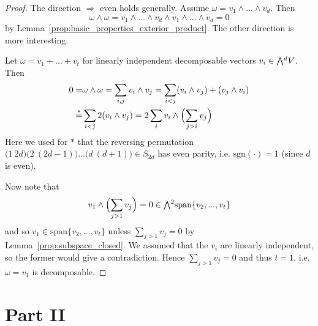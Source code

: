 \documentclass{scrartcl}
\newcommand{\sgn}{\mathrm{sgn}}
\newcommand{\extpow}{\mathchoice{{\textstyle\bigwedge}}
    {{\bigwedge}}
    {{\textstyle\wedge}}
    {{\scriptstyle\wedge}}}
\newcommand{\vspan}{\mathrm{span}}
\theoremstyle{definition}
\begin{document}
\begin{proof}
    The direction $\Rightarrow$ even holds generally. Assume $\omega = v_1 \wedge ... \wedge v_d$.
    Then
    \begin{equation*}
        \omega \wedge \omega = v_1 \wedge ... \wedge v_d \wedge v_1 \wedge ... \wedge v_d = 0
    \end{equation*}
    by Lemma~\ref{prop:basic_properties_exterior_product}. 
    The other direction is more interesting.

    Let $\omega = v_1 + ... + v_t$ for linearly independent decomposable vectors $v_i \in \extpow^d V$.
    Then
    \begin{align*}
        0 =& \omega \wedge \omega = \sum_{i, j} v_i \wedge v_j = \sum_{i < j} (v_i \wedge v_j) + (v_j \wedge v_i) \\
        \overset{*}{=}& \sum_{i < j} 2(v_i \wedge v_j) = 2\sum_i v_i \wedge \Bigl( \sum_{j > i} v_j \Bigr)
    \end{align*}
    Here we used for $*$ that the reversing permutation $\bigl(1 \ 2d\bigr)\bigl(2 \ (2d - 1)\bigr)...\bigl(d \ (d + 1)\bigr) \in S_{2d}$ has even parity, i.e. $\sgn(\cdot) = 1$ (since $d$ is even).

    Now note that
    \begin{equation*}
        v_1 \wedge \Bigl( \sum_{j > 1} v_j \Bigr) = 0 \in \extpow^2 \vspan\{v_2, ..., v_t\}
    \end{equation*}
    and so $v_1 \in \vspan\{v_2, ..., v_t\}$ unless $\sum_{j > 1} v_j = 0$ by Lemma~\ref{prop:subspace_closed}.
    We assumed that the $v_i$ are linearly independent, so the former would give a contradiction.
    Hence $\sum_{j > 1} v_j = 0$ and thus $t = 1$, i.e. $\omega = v_1$ is decomposable.
\end{proof}

\section{Part II}
\end{document}
